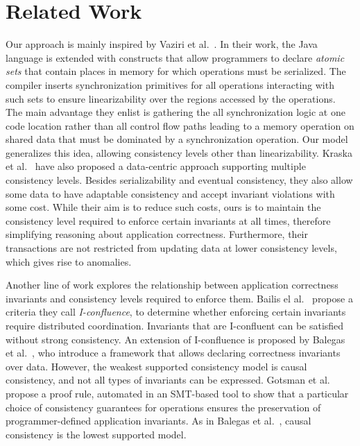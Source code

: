 \documentclass[numbers]{sigplanconf}
\begin{document}
\section{Related Work}
\label{sec:relatedwork}
Our approach is mainly inspired by Vaziri et al.~\cite{dolby2012data}. In their work, 
the Java language is extended with constructs that allow programmers to declare
\emph{atomic sets} that contain places in memory for which operations must be
serialized. The compiler inserts synchronization primitives for all
operations interacting with such sets to ensure linearizability over the
regions accessed by the operations. The main advantage they enlist is gathering
the all synchronization logic at one code location rather than all  control flow
paths leading to a memory operation on
shared data that must be dominated by a synchronization operation. 
Our model generalizes this idea, allowing consistency
levels other than linearizability.
Kraska et al.~\cite{kraska2009consistency} have also proposed a data-centric
approach supporting multiple consistency levels. Besides 
serializability and eventual consistency, they also allow some data to have adaptable consistency and
accept invariant violations with some cost. While their aim is to reduce
such costs, ours is to maintain the consistency level required to enforce
certain invariants at all times, therefore simplifying reasoning about 
application
correctness. Furthermore, their transactions are not restricted from updating
data at lower consistency levels, which gives rise to anomalies.

Another line of work explores the relationship between
application correctness invariants and consistency levels required to enforce them.
Bailis el al.~\cite{bailis2014coordination} propose a criteria they call
\emph{I-confluence}, to determine whether enforcing certain invariants require distributed
coordination. Invariants that are I-confluent can be satisfied without strong
consistency. 
An extension of I-confluence is proposed by Balegas et
al.~\cite{balegas2015putting}, who introduce a framework that allows declaring
correctness invariants over data. However, the weakest supported consistency
model is causal consistency, and not all types of invariants can be
expressed.
Gotsman et al.~\cite{gotsman2016cause} propose a proof rule, automated in an SMT-based
tool to show that a particular choice of consistency guarantees for operations
ensures the preservation of programmer-defined application invariants. As in
Balegas et al.~\cite{balegas2015putting}, causal consistency is the lowest supported model.
\end{document}
